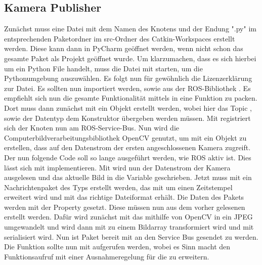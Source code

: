 \subsection{Kamera Publisher}
Zunächst muss eine Datei mit dem Namen des Knotens und der Endung ".py" im entsprechenden Paketordner im src-Ordner des Catkin-Workspaces erstellt werden. Diese kann dann in PyCharm geöffnet werden, wenn nicht schon das gesamte Paket als Projekt geöffnet wurde.
Um klarzumachen, dass es sich hierbei um ein Python File handelt, muss die Datei mit  starten, um die Pythonumgebung auszuwählen. Es folgt nun für gewöhnlich die Lizenzerklärung zur Datei. Es sollten nun  importiert werden, sowie  aus der ROS-Bibliothek . Es empfiehlt sich nun die gesamte Funktionalität mittels  in eine Funktion zu packen. Dort muss dann zunächst mit  ein Objekt erstellt werden, wobei hier das Topic , sowie der Datentyp  dem Konstruktor übergeben werden müssen. Mit  registriert sich der Knoten nun am ROS-Service-Bus. Nun wird die Computerbildverarbeitungsbibliothek OpenCV genutzt, um mit  ein Objekt zu erstellen, dass auf den Datenstrom der ersten angeschlossenen Kamera zugreift. Der nun folgende Code soll so lange ausgeführt werden, wie ROS aktiv ist. Dies lässt sich mit  implementieren. Mit  wird nun der Datenstrom der Kamera ausgelesen und das aktuelle Bild in die Variable  geschrieben. Jetzt muss mit  ein Nachrichtenpaket des Typs  erstellt werden, das mit  um einen Zeitstempel erweitert wird und mit  das richtige Dateiformat erhält. Die Daten des Pakets werden mit der Property  gesetzt. Diese müssen nun aus dem vorher gelesenen  erstellt werden. Dafür wird zunächst mit  das  mithilfe von OpenCV in ein JPEG umgewandelt und wird dann mit  zu einem Bildarray transformiert wird und mit  serialisiert wird. Nun ist Paket bereit mit  an den Service Bus gesendet zu werden. Die Funktion sollte nun mit  aufgerufen werden, wobei es Sinn macht den Funktionsaufruf mit einer Ausnahmeregelung für die  zu erweitern. 
